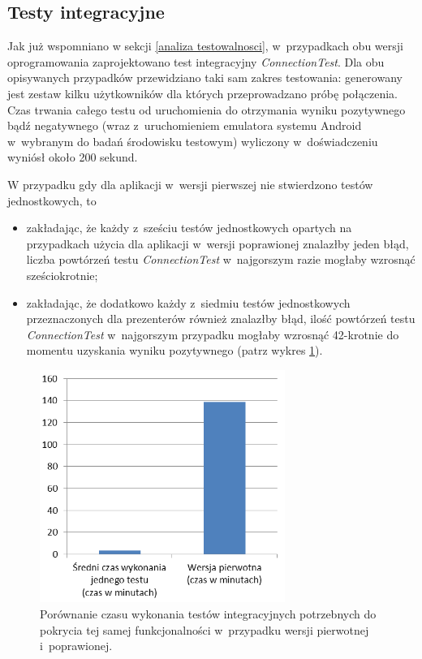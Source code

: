 \subsection{Testy integracyjne}
Jak już wspomniano w sekcji \ref{analiza testowalnosci}, w~przypadkach obu wersji oprogramowania zaprojektowano test integracyjny \textit{ConnectionTest}. Dla obu opisywanych przypadków przewidziano taki sam zakres testowania: generowany jest zestaw kilku użytkowników dla których przeprowadzano próbę połączenia. Czas trwania całego testu od uruchomienia do otrzymania wyniku pozytywnego bądź negatywnego (wraz z~uruchomieniem emulatora systemu Android w~wybranym do badań środowisku testowym) wyliczony w~doświadczeniu wyniósł około 200 sekund. 

W przypadku gdy dla aplikacji w~wersji pierwszej nie stwierdzono testów jednostkowych, to
\begin{itemize}
\item
zakładając, że każdy z~sześciu testów jednostkowych opartych na przypadkach użycia dla aplikacji w~wersji poprawionej znalazłby jeden błąd, liczba powtórzeń testu \textit{ConnectionTest} w~najgorszym razie mogłaby wzrosnąć sześciokrotnie;
\item
zakładając, że dodatkowo każdy z~siedmiu testów jednostkowych przeznaczonych dla prezenterów również znalazłby błąd, ilość powtórzeń testu \textit{ConnectionTest} w~najgorszym przypadku mogłaby wzrosnąć 42-krotnie do momentu uzyskania wyniku pozytywnego (patrz wykres \ref{fig:app_int_czas}).
\end{itemize}
\begin{figure}[!htb]
    \centering
    \includegraphics[width=8cm]{imgs/ch6_app_int_czas.png}
    \caption
{Porównanie czasu wykonania testów integracyjnych potrzebnych do pokrycia tej samej funkcjonalności w~przypadku wersji pierwotnej i~poprawionej. }
    \label{fig:app_int_czas}
\end{figure} 


